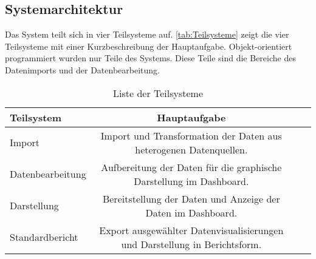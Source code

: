      
    \subsection{Systemarchitektur}
    
    Das System teilt sich in vier Teilsysteme auf. \autoref{tab:Teilsysteme} zeigt die vier Teilsysteme mit einer Kurzbeschreibung der Hauptaufgabe.
    Objekt-orientiert programmiert wurden nur Teile des Systems. Diese Teile sind die Bereiche des Datenimports und der Datenbearbeitung. 
    
       \begingroup
            \setlength{\tabcolsep}{4pt} %
            \renewcommand{\arraystretch}{1.5}
            \begin{table}[h]
                \centering
                \begin{adjustbox}{max width=\textwidth}
                \Huge
                \begin{tabular}{lccl}
                   \toprule
                   \textbf{Teilsystem}             &{Hauptaufgabe} \\
                   \midrule     
                        Import               &Import und Transformation der Daten aus heterogenen Datenquellen.\\
                        Datenbearbeitung     &Aufbereitung der Daten für die graphische Darstellung im Dashboard.\\
                        Darstellung          &Bereitstellung der Daten und Anzeige der Daten im Dashboard.\\
                        Standardbericht      &Export ausgewählter Datenvisualisierungen und Darstellung in Berichtsform.\\

                    \bottomrule
                \end{tabular}
                \end{adjustbox}
                \caption{%
                    Liste der Teilsysteme
                \label{tab:Teilsysteme}
                }
                 \end{table}
            \endgroup
    



